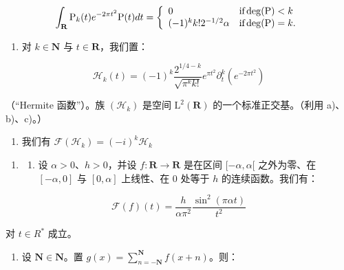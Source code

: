 \[
\int_ {\mathbf {R}} \mathrm{P} _ {k} (t) e ^ {- 2 \pi t ^ {2}} \mathrm{P} (t)   d t = \left\{ \begin{array}{l l} 0 & \text {if} \deg (\mathrm{P}) <   k \\ (- 1) ^ {k} k! 2 ^ {- 1 / 2} \alpha & \text {if} \deg (\mathrm{P}) = k. \end{array} \right.
\]

\begin{enumerate}
\def\labelenumi{\alph{enumi})}
\setcounter{enumi}{3}
\tightlist
\item
  对 \(k \in \mathbf{N}\) 与 \(t \in \mathbf{R}\)，我们置：
\end{enumerate}

\[
\mathcal {H} _ {k} (t) = (- 1) ^ {k} \frac {2 ^ {1 / 4 - k}}{\sqrt {\pi^ {k} k !}} e ^ {\pi t ^ {2}} \partial_ {t} ^ {k} (e ^ {- 2 \pi t ^ {2}})
\]

（“Hermite 函数”）。族 \((\mathcal{H}_{k})\) 是空间 \(\mathrm{L}^{2}(\mathbf{R})\) 的一个标准正交基。（利用 a)、b)、c)。）

\begin{enumerate}
\def\labelenumi{\alph{enumi})}
\setcounter{enumi}{4}
\tightlist
\item
  我们有 \(\mathcal{F}(\mathcal{H}_k) = (-i)^k\mathcal{H}_k\)
\end{enumerate}

\begin{enumerate}
\def\labelenumi{\arabic{enumi})}
\setcounter{enumi}{3}
\tightlist
\item
  \begin{enumerate}
  \def\labelenumii{\alph{enumii})}
  \tightlist
  \item
    设 \(\alpha > 0\)、\(h > 0\)，并设 \(f: \mathbf{R} \to \mathbf{R}\) 是在区间 \([- \alpha, \alpha[\) 之外为零、在 \([- \alpha, 0]\) 与 \([0, \alpha]\) 上线性、在 0 处等于 \(h\) 的连续函数。我们有：
  \end{enumerate}
\end{enumerate}

\[
\mathcal {F} (f) (t) = \frac {h}{\alpha \pi^ {2}} \frac {\sin^ {2} (\pi \alpha t)}{t ^ {2}}
\]

对 \(t \in R^{*}\) 成立。

\begin{enumerate}
\def\labelenumi{\alph{enumi})}
\setcounter{enumi}{1}
\tightlist
\item
  设 \(\mathbf{N} \in \mathbf{N}\)。置 \(g(x) = \sum_{n=-\mathbf{N}}^{\mathbf{N}} f(x + n)\)。则：
\end{enumerate}

